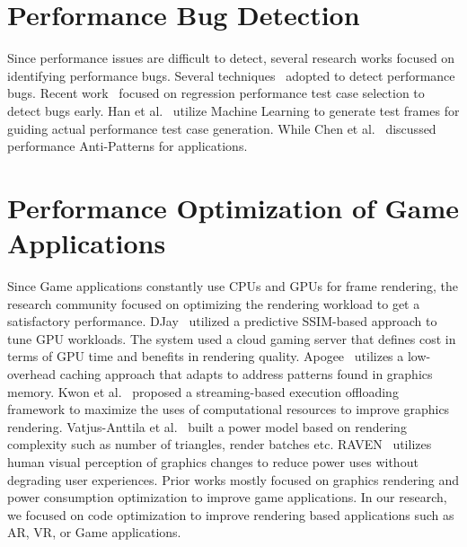 \section{Performance Bug Detection}
\label{sec:detection}
Since performance issues are difficult to detect, several research works focused on identifying performance bugs. Several techniques~\cite{Siegmund2012, Killian2010, Yan2012} adopted to detect performance bugs. Recent work~\cite{Mostafa2017} focused on regression performance test case selection to detect bugs early. Han et al.~\cite{Han2018} utilize Machine Learning to generate test frames for guiding actual performance test case generation. While Chen et al.~\cite{Chen2014} discussed performance Anti-Patterns for applications.


\section{Performance Optimization of Game Applications}
\label{sec:perfgame}
Since Game applications constantly use CPUs and GPUs for frame rendering, the research community focused on optimizing the rendering workload to get a satisfactory performance. DJay~\cite{Grizan15} utilized a predictive SSIM-based approach to tune GPU workloads. The system used a cloud gaming server that defines cost in terms of GPU time and benefits in rendering quality. Apogee~\cite{Sethia_apogee:adaptive} utilizes a low-overhead caching approach that adapts to address patterns found in graphics memory. Kwon et al.~\cite{Kwon2017} proposed a streaming-based execution offloading framework to maximize the uses of computational resources to improve graphics rendering. Vatjus-Anttila et al.~\cite{Vatjus2013} built a power model based on rendering complexity such as number of triangles, render batches etc. RAVEN~\cite{Hwang17} utilizes human visual perception of graphics changes to reduce power uses without degrading user experiences. Prior works mostly focused on graphics rendering and power consumption optimization to improve game applications. In our research, we focused on code optimization to improve rendering based applications such as AR, VR, or Game applications. 
